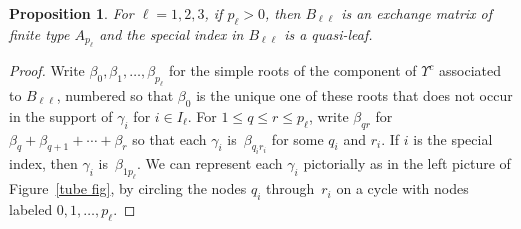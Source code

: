 \documentclass[10pt]{article}
\newtheorem{proposition}{Proposition}[section]
\theoremstyle{definition}
\theoremstyle{remark}
\numberwithin{equation}{section}
\newcommand{\0}{{\mathbf{0}}}
\newcommand{\RSTChar}{\Upsilon}
\newcommand{\RST}[1]{\RSTChar^{#1}}
\begin{document}
\begin{proposition}\label{A and q-l}
  For $\ell=1,2,3$, if $p_\ell>0$, then $B_{\ell\ell}$ is an exchange matrix of finite type $A_{p_\ell}$ and the special index in $B_{\ell\ell}$ is a quasi-leaf.
\end{proposition}
\begin{proof}
Write $\beta_0,\beta_1,\ldots,\beta_{p_\ell}$ for the simple roots of the component of $\RST{c}$ associated to $B_{\ell\ell}$, numbered so that $\beta_0$ is the unique one of these roots that does not occur in the support of $\gamma_i$ for $i\in I_\ell$.
For $1\le q\le r\le p_\ell$, write $\beta_{qr}$ for $\beta_q+\beta_{q+1}+\cdots+\beta_{r}$ so that each $\gamma_i$ is~$\beta_{q_ir_i}$ for some $q_i$ and $r_i$.
If $i$ is the special index, then $\gamma_i$ is~$\beta_{1p_\ell}$.
We can represent each $\gamma_i$ pictorially as in the left picture of Figure~\ref{tube fig}, by circling the nodes $q_i$ through~$r_i$ on a cycle with nodes labeled $0,1,\ldots,p_\ell$.


\end{proof}
\end{document}
